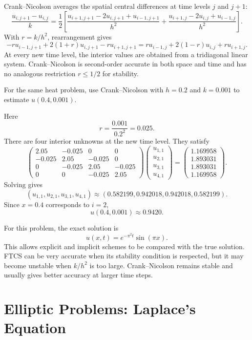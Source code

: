 Crank--Nicolson averages the spatial central differences at time levels $j$ and $j+1$:
\[
 \frac{u_{i,j+1}-u_{i,j}}k
 =\frac12\left[
 \frac{u_{i+1,j+1}-2u_{i,j+1}+u_{i-1,j+1}}{h^2}
 +
 \frac{u_{i+1,j}-2u_{i,j}+u_{i-1,j}}{h^2}
 \right].
\]
With $r=k/h^2$, rearrangement gives
\[
 -ru_{i-1,j+1}+2(1+r)u_{i,j+1}-ru_{i+1,j+1}
 =ru_{i-1,j}+2(1-r)u_{i,j}+ru_{i+1,j}.
\]
At every new time level, the interior values are obtained from a tridiagonal linear system.  Crank--Nicolson is second-order accurate in both space and time and has no analogous restriction $r\le1/2$ for stability.

\begin{example}
For the same heat problem, use Crank--Nicolson with $h=0.2$ and $k=0.001$ to estimate $u(0.4,0.001)$.
\end{example}

\begin{solution}[6.0cm]
Here
\[
 r=\frac{0.001}{0.2^2}=0.025.
\]
There are four interior unknowns at the new time level.  They satisfy
\[
\begin{pmatrix}
2.05&-0.025&0&0\\
-0.025&2.05&-0.025&0\\
0&-0.025&2.05&-0.025\\
0&0&-0.025&2.05
\end{pmatrix}
\begin{pmatrix}
u_{1,1}\\u_{2,1}\\u_{3,1}\\u_{4,1}
\end{pmatrix}
=
\begin{pmatrix}
1.169958\\1.893031\\1.893031\\1.169958
\end{pmatrix}.
\]
Solving gives
\[
 (u_{1,1},u_{2,1},u_{3,1},u_{4,1})
 \approx(0.582199,0.942018,0.942018,0.582199).
\]
Since $x=0.4$ corresponds to $i=2$,
\[
 u(0.4,0.001)\approx0.9420.
\]
\end{solution}

For this problem, the exact solution is
\[
 u(x,t)=e^{-\pi^2t}\sin(\pi x).
\]
This allows explicit and implicit schemes to be compared with the true solution.  FTCS can be very accurate when its stability condition is respected, but it may become unstable when $k/h^2$ is too large.  Crank--Nicolson remains stable and usually gives better accuracy at larger time steps.

\section{Elliptic Problems: Laplace's Equation}

